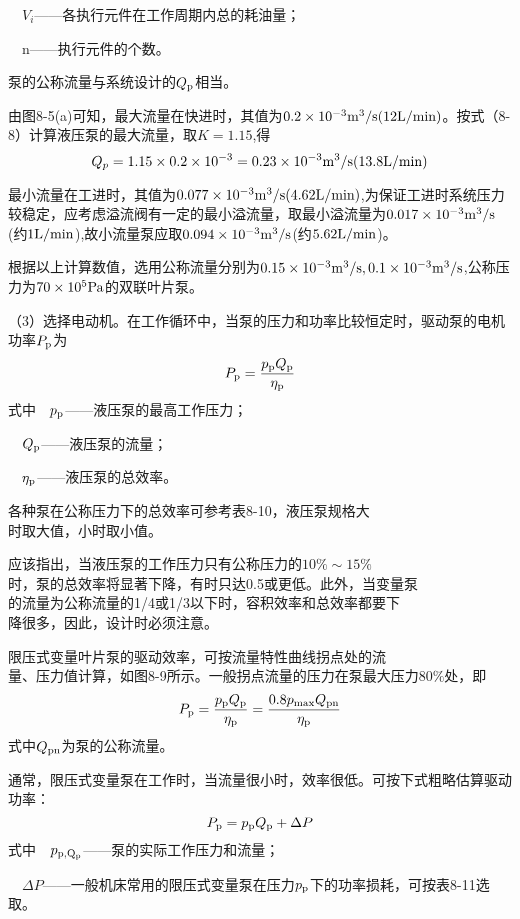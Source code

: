 $\quad V_i$——各执行元件在工作周期内总的耗油量；
       
$\quad$n——执行元件的个数。

泵的公称流量与系统设计的$Q_{\rm p}$相当。

由图8-5(a)可知，最大流量在快进时，其值为$0.2\times10^{-3}{\rm m^3/s(12L/min)}$。按式（8-8）计算液压泵的最大流量，取$K=1.15$,得
$$Q_p=1.15\times0.2\times10^{-3}=0.23\times10^{-3}{\rm m^{3}/s(13.8L/min)}$$

最小流量在工进时，其值为$0.077\times10^{-3}{\rm m^{3}/s(4.62L/min)}$,为保证工进时系统压力较稳定，应考虑溢流阀有一定的最小溢流量，取最小溢流量为$0.017\times10^{-3}{\rm m^{3}/s}$(约$1{\rm L/min}$),故小流量泵应取$0.094\times10^{-3}{\rm m^{3}/s}$(约$5.62{\rm L/min}$)。

根据以上计算数值，选用公称流量分别为$0.15\times10^{-3}{\rm m^3/s},0.1\times10^{-3}{\rm m^{3}/s}$,公称压力为$70\times10^5{\rm Pa}$的双联叶片泵。

（3）选择电动机。在工作循环中，当泵的压力和功率比较恒定时，驱动泵的电机功率$P_{\rm p}$为
\begin{equation}
    P_{\rm p}=\frac{p_{\rm p}Q_{\rm p}}{\eta _{\rm p}}
\end{equation}
式中$\quad p_{\rm p}$——液压泵的最高工作压力；

$\quad Q_{\rm p}$——液压泵的流量；

$\quad \eta _{\rm p}$——液压泵的总效率。

各种泵在公称压力下的总效率可参考表8-10，液压泵规格大\\时取大值，小时取小值。

应该指出，当液压泵的工作压力只有公称压力的$10\%\sim 15\%$\\时，泵的总效率将显著下降，有时只达0.5或更低。此外，当变量泵\\的流量为公称流量的1/4或1/3以下时，容积效率和总效率都要下\\降很多，因此，设计时必须注意。

限压式变量叶片泵的驱动效率，可按流量特性曲线拐点处的流\\量、压力值计算，如图8-9所示。一般拐点流量的压力在泵最大压力$80\%$处，即
\begin{equation}
    P_{\rm p}=\frac{p_{\rm p}Q_{\rm p}}{\eta_{\rm p}}=\frac{0.8p_{\rm max}Q_{\rm pn}}{\eta_{\rm p}}
\end{equation}
式中$Q_{\rm pn}$为泵的公称流量。

通常，限压式变量泵在工作时，当流量很小时，效率很低。可按下式粗略估算驱动功率：
\begin{equation}
    P_{\rm p}=p_{\rm p}Q_{\rm p}+\Delta P
\end{equation}
式中$\quad p_{\rm p,Q_{\rm p}}$——泵的实际工作压力和流量；

$\quad \Delta P$——一般机床常用的限压式变量泵在压力$p_{\rm p}$下的功率损耗，可按表8-11选取。
